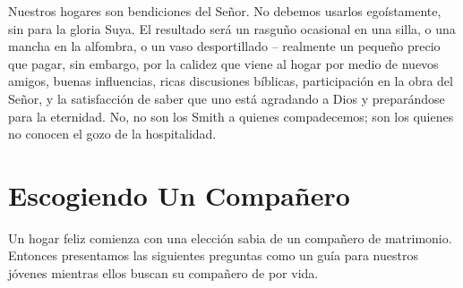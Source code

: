 \documentclass[12pt, twoside, openright]{book}
\begin{document}
Nuestros hogares son bendiciones del Señor. No debemos usarlos egoístamente, sin para la gloria Suya. El resultado será un rasguño ocasional en una silla, o una mancha en la alfombra, o un vaso desportillado – realmente un pequeño precio que pagar, sin embargo, por la calidez que viene al hogar por medio de nuevos amigos, buenas influencias, ricas discusiones bíblicas, participación en la obra del Señor, y la satisfacción de saber que uno está agradando a Dios y preparándose para la eternidad. No, no son los Smith a quienes compadecemos; son los quienes no conocen el gozo de la hospitalidad.

\section{Escogiendo Un Compañero}
Un hogar feliz comienza con una elección sabia de un compañero de matrimonio. Entonces presentamos las siguientes preguntas como un guía para nuestros jóvenes mientras ellos buscan su compañero de por vida.
\end{document}
